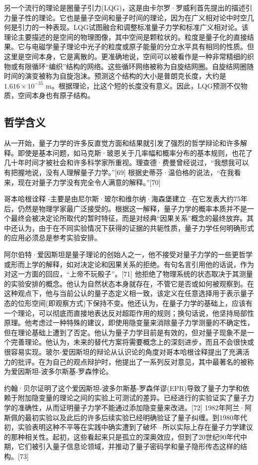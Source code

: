另一个流行的理论是圈量子引力(LQG)，这是由卡尔罗·罗威利首先提出的描述引力量子性的理论。它也是量子空间和量子时间的理论，因为在广义相对论中时空几何是引力的一种表现。LQG试图融合和调整标准量子力学和标准广义相对论。该理论主要描述的是空间的物理图像，其中空间是颗粒状的。粒度是量子化的直接结果。它与电磁学量子理论中光子的粒度或原子能量的分立水平具有相同的性质。但这里是空间本身，它是离散的。更准确地说，空间可以被看作是一种非常精细的织物或有限循环“编织”结构的网络。这些循环网络被称为自旋结网圈。自旋结网圈随时间的演变被称为自旋泡沫。预测这个结构的大小是普朗克长度，大约是$1.616\times10^{-35}$ m。根据理论，比这个短的长度没有意义。因此，LQG预测不仅物质，空间本身也有原子结构。

\subsection{哲学含义}
从一开始，量子力学的许多反直觉方面和结果就引发了强烈的哲学辩论和许多解释。即使是基本问题，如马克斯·玻恩关于几率幅和概率分布的基本规则，也花了几十年时间才被社会和许多科学家所重视。理查德·费曼曾经说过，“我想我可以有把握地说，没有人理解量子力学。”[69] 根据史蒂芬·温伯格的说法，“在我看来，现在对量子力学没有完全令人满意的解释。”[70]

哥本哈根诠释 -主要是由尼尔斯·玻尔和维尔纳·海森堡建立 –在它发表大约75年后，仍然是物理学家最广泛接受的。根据这一解释，量子力学的概率本质并不是一个最终会被决定论所取代的暂时特征，而是对经典“因果关系”概念的最终放弃。其中还认为，由于在不同实验情况下获得的证据的共轭性质，量子力学任何明确形式的应用必须总是参考实验安排。

阿尔伯特·爱因斯坦是量子理论的创始人之一，他不接受对量子力学的一些更哲学或形而上学的解释，如对决定论和因果关系的拒绝。有句名言引用他的话说，作为对这一方面的回应，“上帝不玩骰子”。[71] 他拒绝了物理系统的状态取决于其测量的实验安排的概念。他认为自然状态本身就存在，不管它是否或如何被观察到。在这种观点下，他与当前公认的量子态定义相一致，该定义在任意选择用于表示量子态的位形空间(即观察方式)下保持不变。他还认为，在量子力学的基础上，应该有一个理论，可以彻底而直接地表达反对超距作用的规则；换句话说，他坚持局部性原理。他考虑过一种特殊的建议，即使用隐变量来消除量子力学测量的不确定性，但在理论基础上遭到了否定。他认为量子力学目前是有效的，但对量子现象不是一个完善理论。他认为，未来的替代方案将需要概念上的深刻进步，而且不会很快或很容易实现。玻尔-爱因斯坦的辩论从认识论的角度对哥本哈根诠释提出了充满活力的批评。在为自己的观点辩护时，他提出了一系列反对意见，其中最著名的被称为爱因斯坦-波多尔斯基-罗森悖论。

约翰·贝尔证明了这个爱因斯坦-波多尔斯基-罗森佯谬(EPR)导致了量子力学和依赖于附加隐变量的理论之间的实验上可测试的差异。已经进行的实验证实了量子力学的准确性，从而证明量子力学不能通过添加隐变量来改进。[72] 1982年阿兰·阿斯佩的最初实验以及此后的许多后续实验已经明确验证了量子纠缠。到1980年代初，实验表明这种不平等在实践中确实遭到了破坏 –所以实际上存在量子力学建议的那种相关性。起初，这些看起来只是孤立的深奥效应，但到了20世纪90年代中期，它们被引入量子信息论领域，并推动了量子密码学和量子隐形传态这样的结构。[73]

